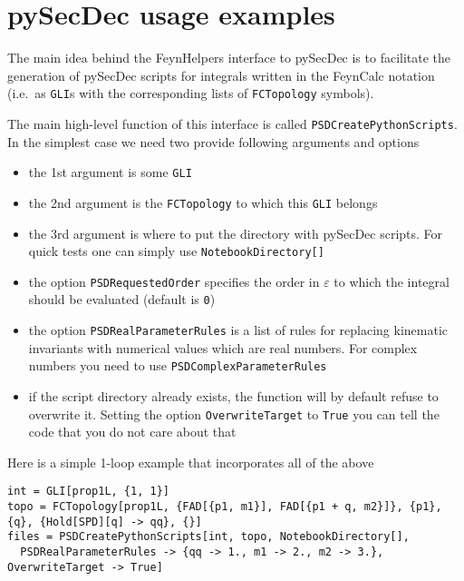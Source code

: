 \documentclass[../FeynHelpersManual.tex]{subfiles}
\begin{document}
\hypertarget{pysecdec usage examples}{
\section{pySecDec usage examples}\label{pysecdec usage examples}}

The main idea behind the FeynHelpers interface to pySecDec is to
facilitate the generation of pySecDec scripts for integrals written in
the FeynCalc notation (i.e.~as \texttt{GLI}s with the corresponding
lists of \texttt{FCTopology} symbols).

The main high-level function of this interface is called
\texttt{PSDCreatePythonScripts}. In the simplest case we need two
provide following arguments and options

\begin{itemize}
\tightlist
\item
  the 1st argument is some \texttt{GLI}
\item
  the 2nd argument is the \texttt{FCTopology} to which this \texttt{GLI}
  belongs
\item
  the 3rd argument is where to put the directory with pySecDec scripts.
  For quick tests one can simply use
  \texttt{NotebookDirectory[\allowbreak{}]}
\item
  the option \texttt{PSDRequestedOrder} specifies the order in
  \(\varepsilon\) to which the integral should be evaluated (default is
  \texttt{0})
\item
  the option \texttt{PSDRealParameterRules} is a list of rules for
  replacing kinematic invariants with numerical values which are real
  numbers. For complex numbers you need to use
  \texttt{PSDComplexParameterRules}
\item
  if the script directory already exists, the function will by default
  refuse to overwrite it. Setting the option \texttt{OverwriteTarget} to
  \texttt{True} you can tell the code that you do not care about that
\end{itemize}

Here is a simple 1-loop example that incorporates all of the above

\begin{verbatim}
int = GLI[prop1L, {1, 1}]
topo = FCTopology[prop1L, {FAD[{p1, m1}], FAD[{p1 + q, m2}]}, {p1}, {q}, {Hold[SPD][q] -> qq}, {}]
files = PSDCreatePythonScripts[int, topo, NotebookDirectory[], 
  PSDRealParameterRules -> {qq -> 1., m1 -> 2., m2 -> 3.}, OverwriteTarget -> True]
\end{verbatim}
\end{document}
